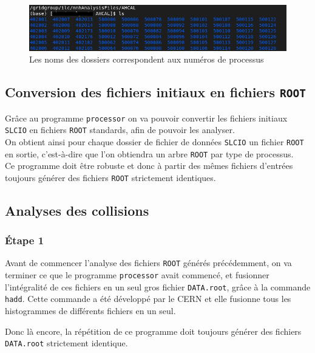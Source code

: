 \documentclass[10pt,a4paper]{report}
\newcommand{\cad}{c'est-à-dire\xspace}
\newcommand{\ROOT}{\texttt{ROOT}\xspace}
\newcommand{\SLCIO}{\texttt{SLCIO}\xspace}
\newcommand{\processor}{\texttt{processor}\xspace}
\begin{document}
\begin{figure}[h!]
	\includegraphics[width=\textwidth]{../img/listeProcessus.png} 
	\caption{Les noms des dossiers correspondent aux numéros de processus}
	\label{data:list}
\end{figure}



\subsection{Conversion des fichiers initiaux en fichiers \ROOT}

Grâce au programme \processor on va pouvoir convertir les fichiers initiaux \SLCIO en fichiers \ROOT standards, afin de pouvoir les analyser.\\

On obtient ainsi pour chaque dossier de fichier de données \SLCIO un fichier \ROOT en sortie, \cad que l'on obtiendra un arbre \ROOT par type de processus.\\

Ce programme doit être robuste et donc à partir des mêmes fichiers d'entrées toujours générer des fichiers \ROOT strictement identiques.

\subsection{Analyses des collisions}

\subsubsection{Étape 1}

Avant de commencer l'analyse des fichiers \ROOT générés précédemment, on va terminer ce que le programme \processor avait commencé, et fusionner l'intégralité de ces fichiers en un seul gros fichier \texttt{DATA.root}, grâce à la commande \texttt{hadd}. 
Cette commande a été développé par le CERN et elle fusionne tous les histogrammes de différents fichiers en un seul\cite{root:hadd}. 

Donc là encore, la répétition de ce programme doit toujours générer des fichiers \texttt{DATA.root} strictement identique.
\end{document}

